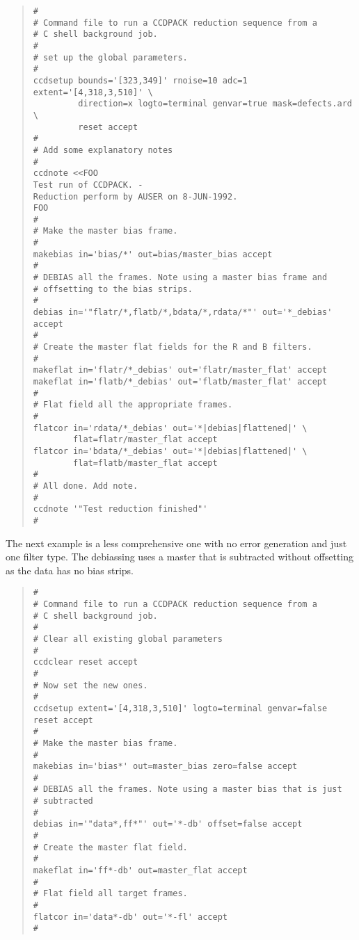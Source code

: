 \documentclass[twoside,11pt]{article}
\renewcommand{\_}{\texttt{\symbol{95}}}
\newenvironment{myquote}{\begin{quote}\begin{small}}{\end{small}\end{quote}}
\begin{document}
\begin{center}
\end{center}
\begin{myquote}
\begin{verbatim}
#
# Command file to run a CCDPACK reduction sequence from a
# C shell background job.
#
# set up the global parameters.
#
ccdsetup bounds='[323,349]' rnoise=10 adc=1 extent='[4,318,3,510]' \
         direction=x logto=terminal genvar=true mask=defects.ard \
         reset accept
#
# Add some explanatory notes
#
ccdnote <<FOO
Test run of CCDPACK. -
Reduction perform by AUSER on 8-JUN-1992.
FOO
#
# Make the master bias frame.
#
makebias in='bias/*' out=bias/master_bias accept
#
# DEBIAS all the frames. Note using a master bias frame and
# offsetting to the bias strips.
#
debias in='"flatr/*,flatb/*,bdata/*,rdata/*"' out='*_debias' accept
#
# Create the master flat fields for the R and B filters.
#
makeflat in='flatr/*_debias' out='flatr/master_flat' accept
makeflat in='flatb/*_debias' out='flatb/master_flat' accept
#
# Flat field all the appropriate frames.
#
flatcor in='rdata/*_debias' out='*|debias|flattened|' \
        flat=flatr/master_flat accept
flatcor in='bdata/*_debias' out='*|debias|flattened|' \
        flat=flatb/master_flat accept
#
# All done. Add note.
#
ccdnote '"Test reduction finished"'
#
\end{verbatim}
\end{myquote}


The next example is a less comprehensive one with no error generation
and just one filter type. The debiassing uses a master that is
subtracted without offsetting as the data has no bias strips.

\begin{center}
\fbox{Example 4}
\end{center}

\begin{myquote}
\begin{verbatim}
#
# Command file to run a CCDPACK reduction sequence from a
# C shell background job.
#
# Clear all existing global parameters
#
ccdclear reset accept
#
# Now set the new ones.
#
ccdsetup extent='[4,318,3,510]' logto=terminal genvar=false reset accept
#
# Make the master bias frame.
#
makebias in='bias*' out=master_bias zero=false accept
#
# DEBIAS all the frames. Note using a master bias that is just
# subtracted
#
debias in='"data*,ff*"' out='*-db' offset=false accept
#
# Create the master flat field.
#
makeflat in='ff*-db' out=master_flat accept
#
# Flat field all target frames.
#
flatcor in='data*-db' out='*-fl' accept
#
\end{verbatim}
\end{myquote}
\end{document}
